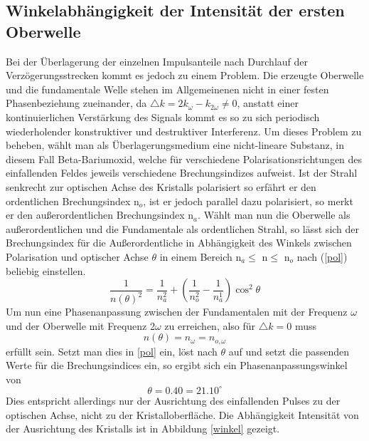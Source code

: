 \subsection{Winkelabhängigkeit der Intensität der ersten Oberwelle}
Bei der Überlagerung der einzelnen Impulsanteile nach Durchlauf der Verzögerungsstrecken kommt es jedoch zu einem Problem. Die erzeugte Oberwelle und die fundamentale Welle stehen im Allgemeinenen nicht in einer festen Phasenbeziehung zueinander, da $\triangle k=2k_\omega-k_{2\omega}\neq0$, anstatt einer kontinuierlichen Verstärkung des Signals kommt es so zu sich periodisch wiederholender konstruktiver und destruktiver Interferenz. Um dieses Problem zu beheben, wählt man als Überlagerungsmedium eine nicht-lineare Substanz, in diesem Fall Beta-Bariumoxid, welche für verschiedene Polarisationsrichtungen des einfallenden Feldes jeweils verschiedene Brechungsindizes aufweist. \newline
Ist der Strahl senkrecht zur optischen Achse des Kristalls polarisiert so erfährt er den ordentlichen Brechungsindex n$_o$, ist er jedoch parallel dazu polarisiert, so merkt er den außerordentlichen Brechungsindex n$_a$. \newline
Wählt man nun die Oberwelle als außerordentlichen und die Fundamentale als ordentlichen Strahl, so lässt sich der Brechungsindex für die Außerordentliche in Abhängigkeit des Winkels zwischen Polarisation und optischer Achse $\theta$ in einem Bereich n$_a\leq$ n$\leq$ n$_o$ nach (\ref{pol}) beliebig einstellen.
\begin{equation}
\frac{1}{n(\theta)^2}=\frac{1}{n_a^2}+\left(\frac{1}{n_o^2}-\frac{1}{n_a^1}\right)\cos^2\theta
\label{pol}
\end{equation}
Um nun eine Phasenanpassung zwischen der Fundamentalen mit der Frequenz $\omega$ und der Oberwelle mit Frequenz 2$\omega$ zu erreichen, also für $\triangle k=0$ muss
\begin{equation}
n(\theta)=n_\omega=n_{o,\omega}
\end{equation}
erfüllt sein. Setzt man dies in \ref{pol} ein, löst nach $\theta$ auf und setzt die passenden Werte für die Brechungsindices ein, so ergibt sich ein Phasenanpassungswinkel von
\begin{equation}
\theta=0.40=21.10^\circ
\end{equation}
Dies entspricht allerdings nur der Ausrichtung des einfallenden Pulses zu der optischen Achse, nicht zu der Kristalloberfläche. Die Abhängigkeit Intensität von der Ausrichtung des Kristalls ist in Abbildung \ref{winkel} gezeigt.
